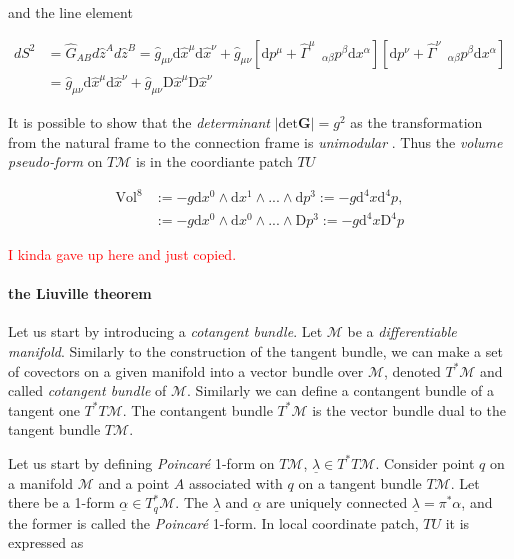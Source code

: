 and the line element 

\begin{align}
dS^2 &= \hat{G}_{AB}d\hat{z}^A d\hat{z}^B = \hat{g}_{\mu\nu}\text{d}\hat{x}^{\mu}\text{d}\hat{x}^{\nu} + \hat{g}_{\mu\nu}[\text{d}p^{\mu} + {\hat{\Gamma}^{\mu}}_{\:\:\:\alpha\beta}p^{\beta}\text{d}x^{\alpha}] [\text{d}p^{\nu} + {\hat{\Gamma}^{\nu}}_{\:\:\:\alpha\beta}p^{\beta}\text{d}x^{\alpha}] \\
&= \hat{g}_{\mu\nu}\text{d}\hat{x}^{\mu}\text{d}\hat{x}^{\nu} + \hat{g}_{\mu\nu}\text{D}\hat{x}^{\mu}\text{D}\hat{x}^{\nu}
\end{align}

It is possible to show that the \textit{determinant} $|\text{det}\boldsymbol{G}| = g^{2}$ as the transformation from the natural frame to the connection frame is \textit{unimodular} \cite{Lindquist:1966}. 
Thus the \textit{volume pseudo-form} on $T\mathcal{M}$ is in the coordiante patch $TU$

\begin{align}
\text{Vol}^8 &:= -g \text{d}x^{0} \wedge \text{d}x^{1} \wedge ... \wedge \text{d}p^{3} := - g\text{d}^{4}x \text{d}^{4}p, \\
&:= -g \text{d}x^{0} \wedge \text{d}x^{0} \wedge ... \wedge \text{D}p^{3} :=-g \text{d}^{4}x\text{D}^4 p
\end{align}

\textcolor{red}{I kinda gave up here and just copied.}


\paragraph{the Liuville theorem}


Let us start by introducing a \textit{cotangent bundle}. 
Let $\mathcal{M}$ be a \textit{differentiable manifold}. 
Similarly to the construction of the tangent bundle, we can make a set of covectors on a given manifold into a vector bundle over $\mathcal{M}$, denoted $T^*\mathcal{M}$ and called \textit{cotangent bundle} of $\mathcal{M}$. 
Similarly we can define a contangent bundle of a tangent one $T^*T\mathcal{M}$. 
The contangent bundle $T^*\mathcal{M}$ is the vector bundle dual to the tangent bundle $T\mathcal{M}$. 

Let us start by defining \textit{Poincar\'e} 1-form on $T\mathcal{M}$, $\underline{\lambda}\in T^* T\mathcal{M}$. 
Consider point $q$ on a manifold $\mathcal{M}$ and a point $A$ associated with $q$ on a tangent bundle $T\mathcal{M}$. 
Let there be a 1-form $\underline{\alpha}\in T^* _q\mathcal{M}$. 
The $\underline{\lambda}$ and $\underline{\alpha}$ are uniquely connected $\underline{\lambda} = \pi^* \alpha$, and the former is called the \textit{Poincar\'e} 1-form. 
In local coordinate patch, $TU$ it is expressed as


